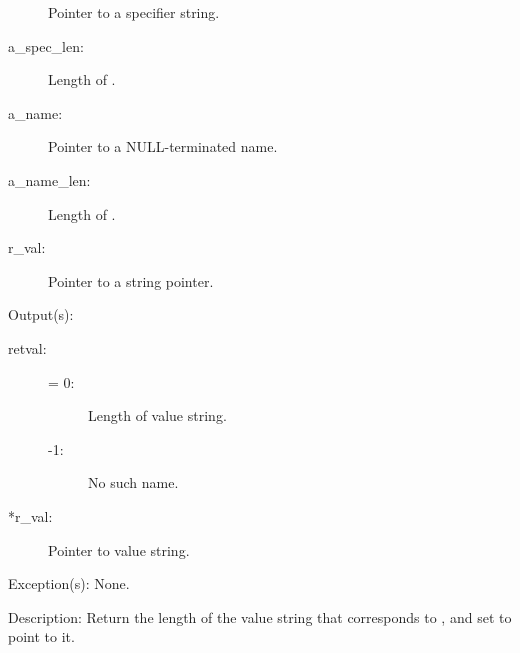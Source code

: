 \begin{capi}
\begin{capilist}
\begin{description}
			Pointer to a specifier string.
		\item[a\_spec\_len: ]
			Length of .
		\item[a\_name: ]
			Pointer to a NULL-terminated name.
		\item[a\_name\_len: ]
			Length of .
		\item[r\_val: ]
			Pointer to a string pointer.
		\end{description}
	\item[Output(s): ]
		\begin{description}\item[]
		\item[retval: ]
			\begin{description}\item[]
			\item[{\gt}= 0: ]
				Length of value string.
			\item[-1: ]
				No such name.
			\end{description}
		\item[*r\_val: ]
			Pointer to value string.
		\end{description}
	\item[Exception(s): ] None.
	\item[Description: ]
		Return the length of the value string that corresponds to
		, and set  to point to it.
	\end{capilist}
\end{capi}
